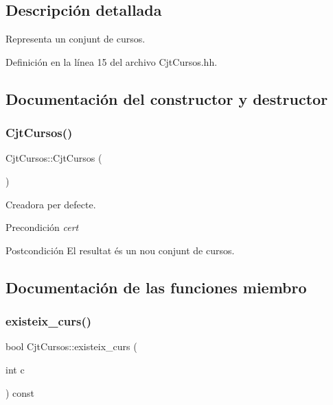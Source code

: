 \subsection{Descripción detallada}
Representa un conjunt de cursos. 

Definición en la línea 15 del archivo Cjt\+Cursos.\+hh.



\subsection{Documentación del constructor y destructor}
\mbox{\label{class_cjt_cursos_a0d8729229189d748a8c62033277268ba}} 
\subsubsection{\texorpdfstring{Cjt\+Cursos()}{CjtCursos()}}
{\footnotesize\ttfamily Cjt\+Cursos\+::\+Cjt\+Cursos (\begin{DoxyParamCaption}{ }\end{DoxyParamCaption})}



Creadora per defecte. 

\begin{DoxyPrecond}{Precondición}
{\itshape cert} 
\end{DoxyPrecond}
\begin{DoxyPostcond}{Postcondición}
El resultat és un nou conjunt de cursos. 
\end{DoxyPostcond}


\subsection{Documentación de las funciones miembro}
\mbox{\label{class_cjt_cursos_ad12b1174de2a5f09cb0c2558645d74dc}} 
\subsubsection{\texorpdfstring{existeix\+\_\+curs()}{existeix\_curs()}}
{\footnotesize\ttfamily bool Cjt\+Cursos\+::existeix\+\_\+curs (\begin{DoxyParamCaption}\item[{int}]{c }\end{DoxyParamCaption}) const}




